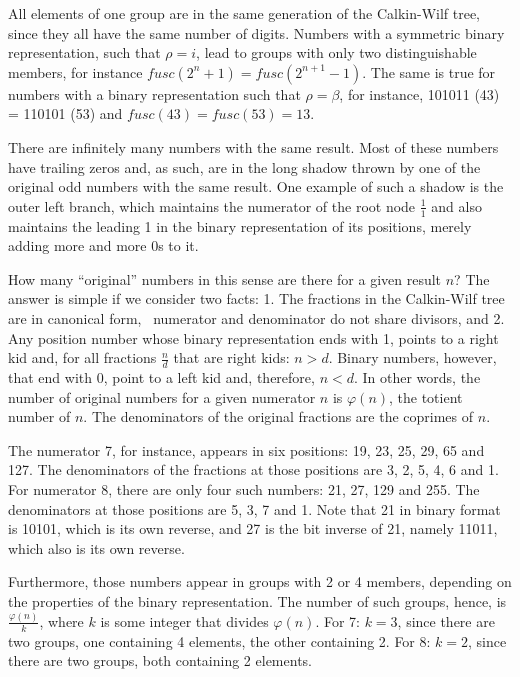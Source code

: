 \documentclass[tikz]{scrreprt}
\newcommand{\texfamily}{\fontfamily{cmtex}\selectfont}
\begin{document}
All elements of one group are in the same generation
of the Calkin-Wilf tree,
since they all have the same number of digits.
Numbers with a symmetric binary representation,
such that $\rho = i$, lead to groups with only 
two distinguishable members, for instance
$fusc(2^n+1) = fusc(2^{n+1}-1)$.
The same is true for numbers with a binary representation
such that $\rho = \beta$, for instance, 
101011 (43) = 110101 (53) and $fusc(43) = fusc(53) = 13$.

There are infinitely many numbers
with the same \text{\texfamily fusc} result.
Most of these numbers have trailing zeros
and, as such, are in the long shadow thrown 
by one of the original odd numbers with the same result.
One example of such a shadow is the outer left branch,
which maintains the numerator of the root node $\frac{1}{1}$
and also maintains the leading 1 in the binary representation
of its positions, merely adding more and more 0s to it.

How many ``original'' numbers in this sense are there
for a given \text{\texfamily fusc} result $n$?
The answer is simple if we consider two facts:
1. The fractions in the Calkin-Wilf tree are in
canonical form, \ie\ numerator and denominator
do not share divisors, and
2. Any position number whose binary representation
ends with 1, points to a right kid and, for all fractions
$\frac{n}{d}$ that are right kids:
$n > d$. Binary numbers, however, that end with 0,
point to a left kid and, therefore, $n < d$.
In other words, the number of original numbers
for a given numerator $n$ is $\varphi(n)$, the totient number of $n$.
The denominators of the original fractions are 
the coprimes of $n$.

The numerator 7, for instance, appears in six positions:
19, 23, 25, 29, 65 and 127.
The denominators of the fractions at those positions are
3, 2, 5, 4, 6 and 1.
For numerator 8, there are only four such numbers:
21, 27, 129 and 255.
The denominators at those positions are 5, 3, 7 and 1.
Note that 21 in binary format is 10101, 
which is its own reverse,
and 27 is the bit inverse of 21, namely 11011,
which also is its own reverse.

Furthermore, those numbers appear in groups
with 2 or 4 members, depending on the properties 
of the binary representation. The number of such groups,
hence, is $\frac{\varphi(n)}{k}$, 
where $k$ is some integer that divides $\varphi(n)$.
For 7: $k=3$, since there are two groups,
one containing 4 elements, the other containing 2.
For 8: $k=2$, since there are two groups, 
both containing 2 elements.
\end{document}
